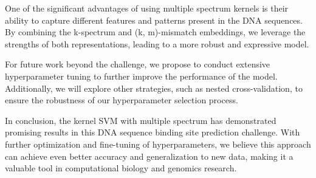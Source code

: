 \documentclass[times,5p, twocolumn]{elsarticle}
\begin{document}
One of the significant advantages of using multiple spectrum kernels is their ability to capture different features and patterns present in the DNA sequences. By combining the k-spectrum and (k, m)-mismatch embeddings, we leverage the strengths of both representations, leading to a more robust and expressive model.

For future work beyond the challenge, we propose to conduct extensive hyperparameter tuning to further improve the performance of the model. Additionally, we will explore other strategies, such as nested cross-validation, to ensure the robustness of our hyperparameter selection process.

In conclusion, the kernel SVM with multiple spectrum has demonstrated promising results in this DNA sequence binding site prediction challenge. With further optimization and fine-tuning of hyperparameters, we believe this approach can achieve even better accuracy and generalization to new data, making it a valuable tool in computational biology and genomics research.

% 
% 
% 






\renewcommand{\bibname}{References}
\nocite{*}


\end{document}
